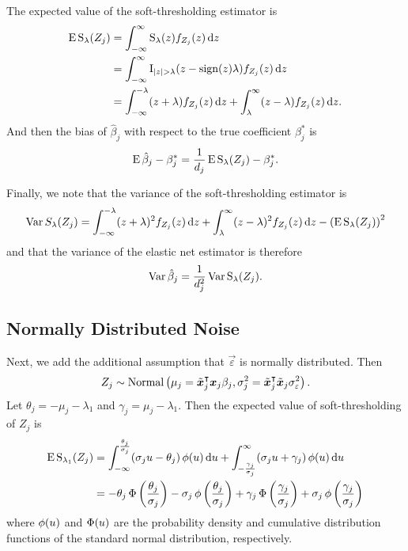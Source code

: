The expected value of the soft-thresholding estimator is
\begin{align*}
  \label{eq:st-expected-value}
  \operatorname{E} \operatorname{S}_\lambda({Z_j}) & = \int_{-\infty}^\infty \operatorname{S}_\lambda(z) f_{Z_j}(z) \mathop{}\!\mathrm{d} z                                                   \nonumber \\
                        & = \int_{-\infty}^\infty \operatorname{I}_{|z| > \lambda} (z -\operatorname{sign}(z)\lambda) f_{Z_j}(z) \mathop{}\!\mathrm{d} z                         \nonumber \\
                        & = \int_{-\infty}^{-\lambda}(z + \lambda)f_{Z_j}(z) \mathop{}\!\mathrm{d} z + \int_{\lambda}^\infty (z - \lambda)f_{Z_j}(z) \mathop{}\!\mathrm{d} z.
\end{align*}
And then the bias of \(\hat\beta_j\) with respect to the true coefficient \(\beta_j^*\) is
\begin{equation*}
  \label{eq:betahat-bias}
  \operatorname{E} \hat\beta_j - \beta_j^* = \frac{1}{d_j}\operatorname{E} \operatorname{S}_\lambda({Z_j}) - \beta^*_j.
\end{equation*}

Finally, we note that the variance of the soft-thresholding estimator is
\begin{equation}
  \label{eq:st-variance}
  \operatorname{Var} {S_\lambda({Z_j})} = \int_{-\infty}^{-\lambda}(z + \lambda)^2f_{Z_j}(z) \mathop{}\!\mathrm{d} z + \int_{\lambda}^\infty (z - \lambda)^2 f_{Z_j}(z) \mathop{}\!\mathrm{d} z - \left(\operatorname{E} \operatorname{S}_\lambda({Z_j})\right)^2
\end{equation}
and that the variance of the elastic net estimator is therefore
\begin{equation}
  \label{eq:betahat-variance}
  \operatorname{Var} \hat\beta_j = \frac{1}{d_j^2} \operatorname{Var} \operatorname{S}_\lambda({Z_j}).
\end{equation}

\subsection{Normally Distributed Noise}

Next, we add the additional assumption that \(\vec{\varepsilon}\) is normally distributed.
Then
\[
  {Z_j} \sim \operatorname{Normal}\left(\mu_j = \tilde{\boldsymbol{x}}_j^\intercal\boldsymbol{x}_j \beta_j, \sigma_j^2 = \tilde{\boldsymbol{x}}_j^\intercal\tilde{\boldsymbol{x}}_j \sigma_\varepsilon^2 \right).
\]
Let \(\theta_j = -\mu_j -\lambda_1 \) and \(\gamma_j = \mu_j - \lambda_1\). Then the
expected value of soft-thresholding of \({Z_j}\) is
\begin{align}
  \operatorname{E} \operatorname{S}_{\lambda_1}({Z_j}) & = \int_{-\infty}^\frac{\theta_j}{\sigma_j} (\sigma_j u - \theta_j) \operatorname{\phi}(u) \mathop{}\!\mathrm{d} u + \int_{-\frac{\gamma_j}{\sigma_j}}^\infty (\sigma_j u + \gamma_j) \operatorname{\phi}(u) \mathop{}\!\mathrm{d} u                                               \nonumber                              \\
                            & = -\theta_j \operatorname{\Phi}\left(\frac{\theta_j}{\sigma_j}\right) - \sigma_j \operatorname{\phi}\left(\frac{\theta_j}{\sigma_j}\right) + \gamma_j \operatorname{\Phi}\left(\frac{\gamma_j}{\sigma_j}\right) + \sigma_j \operatorname{\phi}\left(\frac{\gamma_j}{\sigma_j}\right) \label{eq:mean-centered-eval}
\end{align}
where \(\operatorname{\phi}(u)\) and \(\operatorname{\Phi}(u)\) are the probability density and cumulative distribution
functions of the standard normal distribution, respectively.


